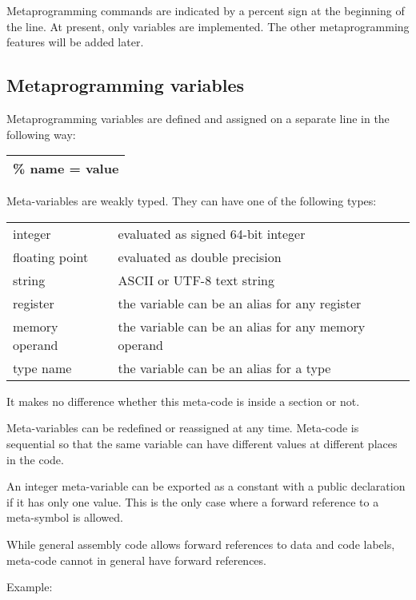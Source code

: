 \documentclass[forwardcom.tex]{subfiles}
\begin{document}
Metaprogramming commands are indicated by a percent sign at the beginning of the line.
At present, only variables are implemented. The other metaprogramming features will be added later.
\vv


\subsection{Metaprogramming variables} \label{MetaprogrammingVariables}

Metaprogramming variables are defined and assigned on a separate line in the following way:
\vv

\begin{tabular}{|p{154mm}|}
\hline
\hspace{4mm} \% name = value\\
\hline
\end{tabular}
\vspace{4mm}

Meta-variables are weakly typed. They can have one of the following types:

\begin{tabular}{|p{30mm}p{120mm}|}
\hline
integer & evaluated as signed 64-bit integer \\
floating point & evaluated as double precision\\
string & ASCII or UTF-8 text string\\
register & the variable can be an alias for any register\\
memory operand & the variable can be an alias for any memory operand\\
type name & the variable can be an alias for a type\\
\hline
\end{tabular}
\vv

It makes no difference whether this meta-code is inside a section or not.
\vv

Meta-variables can be redefined or reassigned at any time. Meta-code is sequential so that the same variable can have different values at different places in the code.
\vv

An integer meta-variable can be exported as a constant with a public declaration if it has only one value. This is the only case where a forward reference to a meta-symbol is allowed.
\vv

While general assembly code allows forward references to data and code labels, meta-code cannot in general have forward references.
\vv

Example:
\vv
\end{document}
